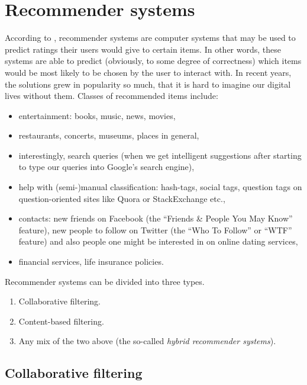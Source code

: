 \section{Recommender systems}

According to \cite{Ricci:recommenders}, recommender systems are computer systems that may be used to predict ratings their users would give to certain items. In other words, these systems are able to predict (obviously, to some degree of correctness) which items would be most likely to be chosen by the user to interact with. In recent years, the solutions grew in popularity so much, that it is hard to imagine our digital lives without them. Classes of recommended items include:

\begin{itemize}
	\item entertainment: books, music, news, movies,
	\item restaurants, concerts, museums, places in general,
	\item interestingly, search queries (when we get intelligent suggestions after starting to type our queries into Google's search engine),
	\item help with (semi-)manual classification: hash-tags, social tags, question tags on question-oriented sites like Quora or StackExchange etc.,
	\item contacts: new friends on Facebook (the ``Friends \& People You May Know'' feature), new people to follow on Twitter (the ``Who To Follow'' or ``WTF'' feature) and also people one might be interested in on online dating services,
	\item financial services, life insurance policies. \cite{Felfernig:recommenders}
\end{itemize}

Recommender systems can be divided into three types.

\begin{enumerate}
	\item Collaborative filtering.
	\item Content-based filtering.
	\item Any mix of the two above (the so-called \emph{hybrid recommender systems}).
\end{enumerate}

\subsection{Collaborative filtering}

